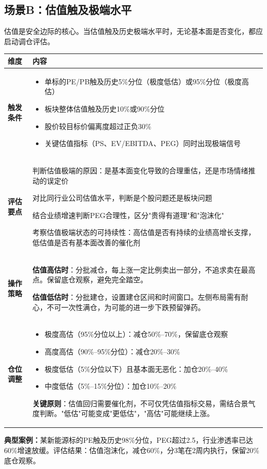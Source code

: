 \subsection{场景B：估值触及极端水平}

估值是安全边际的核心。当估值触及历史极端水平时，无论基本面是否变化，都应启动调仓评估。

\begin{exhibitbox}[表9-18：估值极端水平调仓指南]
\scriptsize
\setlength{\tabcolsep}{3pt}
\renewcommand{\arraystretch}{1.12}
\begin{tabularx}{\textwidth}{l X}
\toprule
\textbf{维度} & \textbf{内容} \\
\midrule
\textbf{触发条件} & 
\begin{itemize}[leftmargin=1.2em]
\item 单标的PE/PB触及历史5\%分位（极度低估）或95\%分位（极度高估）
\item 板块整体估值触及历史10\%或90\%分位
\item 股价较目标价偏离度超过正负30\%
\item 关键估值指标（PS、EV/EBITDA、PEG）同时出现极端信号
\end{itemize}
\\
\midrule
\textbf{评估要点} & 
判断估值极端的原因：是基本面变化导致的合理重估，还是市场情绪推动的误定价

对比同行业公司估值水平，判断是个股问题还是板块问题

结合业绩增速判断PEG合理性，区分"贵得有道理"和"泡沫化"

考察估值极端状态的可持续性：高估值是否有持续的业绩高增长支撑，低估值是否有基本面改善的催化剂
\\
\midrule
\textbf{操作策略} & 
\textbf{估值高估时}：分批减仓，每上涨一定比例卖出一部分，不追求卖在最高点。保留底仓观察，避免完全踏空。

\textbf{估值低估时}：分批建仓，设置建仓区间和时间窗口。左侧布局需有耐心，不可一次性满仓，为可能的进一步下跌预留弹药。
\\
\midrule
\textbf{仓位调整} & 
\begin{itemize}[leftmargin=1.2em]
\item 极度高估（95\%分位以上）：减仓50\%--70\%，保留底仓观察
\item 高度高估（90\%--95\%分位）：减仓20\%--30\%
\item 极度低估（5\%分位以下）且基本面无恶化：加仓20\%--40\%
\item 中度低估（5\%--15\%分位）：加仓10\%--20\%
\end{itemize}
\vspace{0.3em}
\textbf{关键原则}：估值回归需要催化剂，不可仅凭估值指标交易，需结合景气度判断。"低估"可能变成"更低估"，"高估"可能继续上涨。
\\
\bottomrule
\end{tabularx}
\vspace{0.2cm}

\textbf{典型案例：}某新能源标的PE触及历史98\%分位，PEG超过2.5，行业渗透率已达60\%增速放缓。评估结果：估值泡沫化，减仓60\%，分3笔在2周内执行，保留20\%底仓观察。
\end{exhibitbox}

